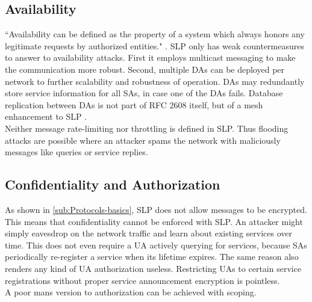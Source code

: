 \subsection{Availability}
``Availability can be defined as the property of a system which always honors any legitimate requests by authorized entities." \citep{Cotroneo2004}. SLP only has weak countermeasures to answer to availability attacks. First it employs multicast messaging to make the communication more robust. Second, multiple DAs can be deployed per network to further scalability and robustness of operation. DAs may redundantly store service information for all SAs, in case one of the DAs fails. Database replication between DAs is not part of RFC 2608 itself, but of a mesh enhancement to SLP \citep{Zhao2003}.\\
Neither message rate-limiting nor throttling is defined in SLP. Thus flooding attacks are possible where an attacker spams the network with maliciously messages like queries or service replies.

\subsection{Confidentiality and Authorization\label{sub:Confidentiality-and-Authorization}}
As shown in \ref{sub:Protocols-basics}, SLP does not allow messages to be encrypted. This means that confidentiality cannot be enforced with SLP. An attacker might simply eavesdrop on the network traffic and learn about existing services over time. This does not even require a UA actively querying for services, because SAs periodically re-register a service when its lifetime expires. The same reason also renders any kind of UA authorization useless. Restricting UAs to certain service registrations without proper service announcement encryption is pointless.\\
A poor mans version to authorization can be achieved with scoping.